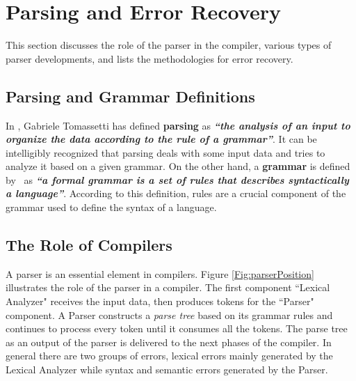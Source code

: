 \section{Parsing and Error Recovery}
\label{sec:bck_parser}
This section discusses the role of the parser in the compiler, various types of parser developments, and lists the methodologies for error recovery. 

\subsection{Parsing and Grammar Definitions}

In \cite{parsingGuide2017}, Gabriele Tomassetti has defined \textbf{parsing} as {\it  \textbf{``the analysis of an input to organize the data according to the rule of a grammar''}}. It can be intelligibly recognized that parsing deals with some input data and tries to analyze it based on a given grammar. 
On the other hand, a \textbf{grammar} is defined by~\cite{parsingGuide2017} as {\it \textbf{``a formal grammar is a set of rules that describes syntactically a language''}}. 
According to this definition, rules are a crucial component of the grammar used to define the syntax of a language.

\subsection{The Role of  Compilers}
A parser is an essential element in  compilers. 
{Figure \ref{Fig:parserPosition}} illustrates the role of the parser in a compiler. 
The first component ``Lexical Analyzer" receives the input data, then produces tokens for the ``Parser" component. A Parser constructs a \emph{parse tree} based on its grammar rules and continues to process every token until it consumes all the tokens. 
The parse tree as an output of the parser is delivered to the next phases of the compiler. 
In general there are two groups of errors, lexical errors mainly generated by the Lexical Analyzer while syntax and semantic errors generated by the Parser.

